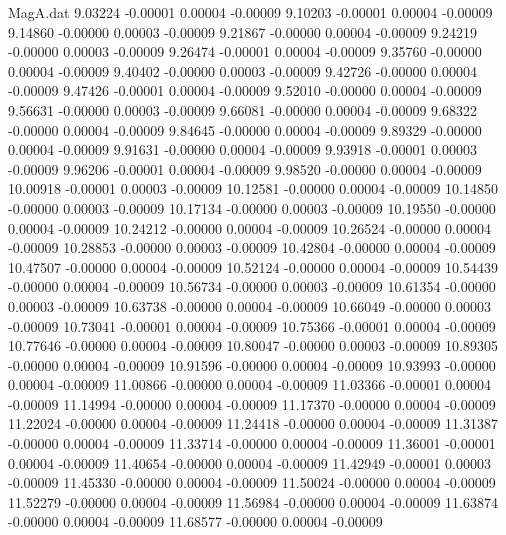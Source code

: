 \begin{filecontents}{MagA.dat}
   9.03224   -0.00001    0.00004   -0.00009
   9.10203   -0.00001    0.00004   -0.00009
   9.14860   -0.00000    0.00003   -0.00009
   9.21867   -0.00000    0.00004   -0.00009
   9.24219   -0.00000    0.00003   -0.00009
   9.26474   -0.00001    0.00004   -0.00009
   9.35760   -0.00000    0.00004   -0.00009
   9.40402   -0.00000    0.00003   -0.00009
   9.42726   -0.00000    0.00004   -0.00009
   9.47426   -0.00001    0.00004   -0.00009
   9.52010   -0.00000    0.00004   -0.00009
   9.56631   -0.00000    0.00003   -0.00009
   9.66081   -0.00000    0.00004   -0.00009
   9.68322   -0.00000    0.00004   -0.00009
   9.84645   -0.00000    0.00004   -0.00009
   9.89329   -0.00000    0.00004   -0.00009
   9.91631   -0.00000    0.00004   -0.00009
   9.93918   -0.00001    0.00003   -0.00009
   9.96206   -0.00001    0.00004   -0.00009
   9.98520   -0.00000    0.00004   -0.00009
  10.00918   -0.00001    0.00003   -0.00009
  10.12581   -0.00000    0.00004   -0.00009
  10.14850   -0.00000    0.00003   -0.00009
  10.17134   -0.00000    0.00003   -0.00009
  10.19550   -0.00000    0.00004   -0.00009
  10.24212   -0.00000    0.00004   -0.00009
  10.26524   -0.00000    0.00004   -0.00009
  10.28853   -0.00000    0.00003   -0.00009
  10.42804   -0.00000    0.00004   -0.00009
  10.47507   -0.00000    0.00004   -0.00009
  10.52124   -0.00000    0.00004   -0.00009
  10.54439   -0.00000    0.00004   -0.00009
  10.56734   -0.00000    0.00003   -0.00009
  10.61354   -0.00000    0.00003   -0.00009
  10.63738   -0.00000    0.00004   -0.00009
  10.66049   -0.00000    0.00003   -0.00009
  10.73041   -0.00001    0.00004   -0.00009
  10.75366   -0.00001    0.00004   -0.00009
  10.77646   -0.00000    0.00004   -0.00009
  10.80047   -0.00000    0.00003   -0.00009
  10.89305   -0.00000    0.00004   -0.00009
  10.91596   -0.00000    0.00004   -0.00009
  10.93993   -0.00000    0.00004   -0.00009
  11.00866   -0.00000    0.00004   -0.00009
  11.03366   -0.00001    0.00004   -0.00009
  11.14994   -0.00000    0.00004   -0.00009
  11.17370   -0.00000    0.00004   -0.00009
  11.22024   -0.00000    0.00004   -0.00009
  11.24418   -0.00000    0.00004   -0.00009
  11.31387   -0.00000    0.00004   -0.00009
  11.33714   -0.00000    0.00004   -0.00009
  11.36001   -0.00001    0.00004   -0.00009
  11.40654   -0.00000    0.00004   -0.00009
  11.42949   -0.00001    0.00003   -0.00009
  11.45330   -0.00000    0.00004   -0.00009
  11.50024   -0.00000    0.00004   -0.00009
  11.52279   -0.00000    0.00004   -0.00009
  11.56984   -0.00000    0.00004   -0.00009
  11.63874   -0.00000    0.00004   -0.00009
  11.68577   -0.00000    0.00004   -0.00009

\end{filecontents}
